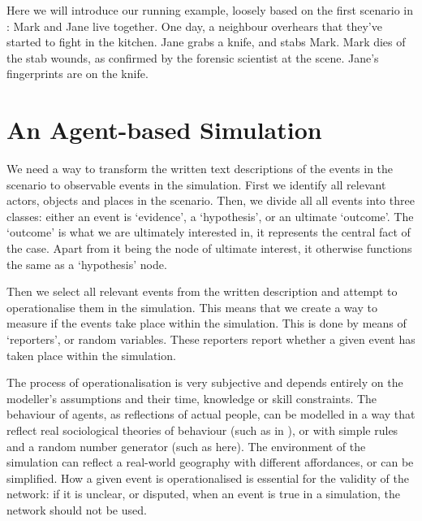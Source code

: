 \begin{example}
Here we will introduce our running example, loosely based on the first scenario in \citep{Vlek2015}: Mark and Jane live together. One day, a neighbour overhears that they've started to fight in the kitchen. Jane grabs a knife, and stabs Mark. Mark dies of the stab wounds, as confirmed by the forensic scientist at the scene. Jane's fingerprints are on the knife.
\end{example}

\section{An Agent-based Simulation}


We need a way to transform the written text descriptions of the events in the scenario to observable events in the simulation. First we identify all relevant actors, objects and places in the scenario. Then, we divide all all events into three classes: either an event is `evidence', a `hypothesis', or an ultimate `outcome'. The `outcome' is what we are ultimately interested in, it represents the central fact of the case. Apart from it being the node of ultimate interest, it otherwise functions the same as a `hypothesis' node.

Then we select all relevant events from the written description and attempt to operationalise them in the simulation. This means that we create a way to measure if the events take place within the simulation. This is done by means of `reporters', or random variables. These reporters report whether a given event has taken place within the simulation. 

The process of operationalisation is very subjective and depends entirely on the modeller's assumptions and their time, knowledge or skill constraints. The behaviour of agents, as reflections of actual people, can be modelled in a way that reflect real sociological theories of behaviour (such as in \citet{Gerritsen2015}), or with simple rules and a random number generator (such as here). The environment of the simulation can reflect a real-world geography with different affordances, or can be simplified. How a given event is operationalised is essential for the validity of the network: if it is unclear, or disputed, when an event is true in a simulation, the network should not be used.

